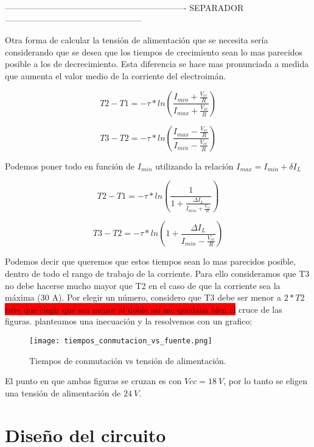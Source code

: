----------------------------------------------------------------
SEPARADOR
------------------------------------------------


Otra forma de calcular la tensión de alimentación que se necesita sería considerando que se desea que los tiempos de crecimiento sean lo mas parecidos posible a los de decrecimiento. Esta diferencia se hace mas pronunciada a medida que aumenta el valor medio de la corriente del electroimán.

\begin{equation}
	T2-T1=-\tau*ln(\frac{I_{min}+\frac{V_{cc}}{R}}{I_{max}+\frac{V_{cc}}{R}})
\end{equation}

\begin{equation}
	T3-T2=-\tau*ln(\frac{I_{max}-\frac{V_{cc}}{R}}{I_{min}-\frac{V_{cc}}{R}})
\end{equation}


Podemos poner todo en función de $I_{min}$ utilizando la relación $I_{max}=I_{min}+\delta I_L$

\begin{equation}
	T2-T1=-\tau*ln(\frac{1}{1+\frac{\Delta I_L}{I_{min}+\frac{V_{cc}}{R}}})
\end{equation}

\begin{equation}
	T3-T2=-\tau*ln(1+\frac{\Delta I_L}{I_{min}-\frac{V_{cc}}{R}})
\end{equation}


Podemos decir que queremos que estos tiempos sean lo mas parecidos posible, dentro de todo el rango de trabajo de la corriente. Para ello consideramos que T3 no debe hacerse mucho mayor que T2 en el caso de que la corriente sea la máxima (30 A). Por elegir un número, considero que T3 debe ser menor a $2*T2$ \colorbox{red}{tuve que elegir que sea menor al doble así me quedaba bien el} cruce de las figuras.  planteamos una inecuación y la resolvemos con un grafico:

\begin{figure}[H]
	\centering
	\texttt{[image: tiempos\_conmutacion\_vs\_fuente.png]}
	\caption{Tiempos de conmutación vs tensión de alimentación.}
	\label{fig:img_tiempos_conmutacion}
\end{figure}

El punto en que ambas figuras se cruzan es con $Vcc=18\:V$, por lo tanto se eligen una tensión de alimentación de $24\:V$.


\section{Diseño del circuito}

